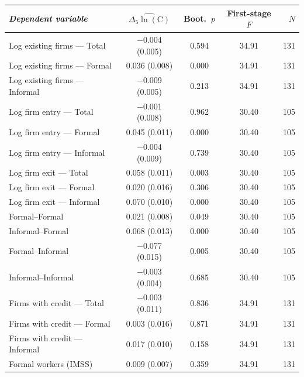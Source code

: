 \begin{threeparttable}
    \begin{tabular}{lcccr}
        \toprule
        \textit{Dependent variable} & $\widehat{\Delta_5\ln(\text{C})}$ & Boot.\ $p$ & First-stage $F$ & $N$ \\
        \midrule
        Log existing firms --- Total    & $-$0.004          (0.005) & 0.594 & 34.91 & 131 \\
        Log existing firms --- Formal   & \phantom{$-$}0.036\sym{***} (0.008) & 0.000 & 34.91 & 131 \\
        Log existing firms --- Informal & $-$0.009\sym{*}   (0.005) & 0.213 & 34.91 & 131 \\
        Log firm entry --- Total        & $-$0.001          (0.008) & 0.962 & 30.40 & 105 \\
        Log firm entry --- Formal       & \phantom{$-$}0.045\sym{***} (0.011) & 0.000 & 30.40 & 105 \\
        Log firm entry --- Informal     & $-$0.004          (0.009) & 0.739 & 30.40 & 105 \\
        Log firm exit --- Total         & \phantom{$-$}0.058\sym{***} (0.011) & 0.003 & 30.40 & 105 \\
        Log firm exit --- Formal        & \phantom{$-$}0.020          (0.016) & 0.306 & 30.40 & 105 \\
        Log firm exit --- Informal      & \phantom{$-$}0.070\sym{***} (0.010) & 0.000 & 30.40 & 105 \\
        \midrule
        Formal--Formal                  & \phantom{$-$}0.021\sym{***} (0.008) & 0.049 & 30.40 & 105 \\
        Informal--Formal                & \phantom{$-$}0.068\sym{***} (0.013) & 0.000 & 30.40 & 105 \\
        Formal--Informal                & $-$0.077\sym{***} (0.015) & 0.005 & 30.40 & 105 \\
        Informal--Informal              & $-$0.003          (0.004) & 0.685 & 30.40 & 105 \\
        \midrule
        Firms with credit --- Total     & $-$0.003          (0.011) & 0.836 & 34.91 & 131 \\
        Firms with credit --- Formal    & \phantom{$-$}0.003          (0.016) & 0.871 & 34.91 & 131 \\
        Firms with credit --- Informal  & \phantom{$-$}0.017          (0.010) & 0.158 & 34.91 & 131 \\
        \midrule
        Formal workers (IMSS)           & \phantom{$-$}0.009          (0.007) & 0.359 & 34.91 & 131 \\

\end{tabular}
\end{threeparttable}
